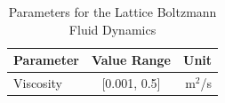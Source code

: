 \begin{table}[h]
\centering
\begin{tabular}{|l|c|r|}
\hline
Parameter & Value Range & Unit \\
\hline
Viscosity & [0.001, 0.5] & m$^2$/s \\
\hline
\end{tabular}
\caption{Parameters for the Lattice Boltzmann Fluid Dynamics}
\end{table}

